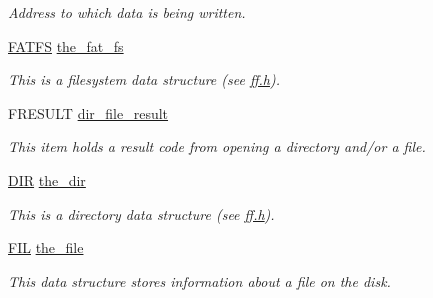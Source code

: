 \begin{DoxyCompactItemize}
\begin{DoxyCompactList}\small\item\em Address to which data is being written. \end{DoxyCompactList}\item 
\hypertarget{classsd__card_a908c8eb86a3ed04bd4653632e508588c}{\hyperlink{struct__FATFS__}{F\-A\-T\-F\-S} \hyperlink{classsd__card_a908c8eb86a3ed04bd4653632e508588c}{the\-\_\-fat\-\_\-fs}}\label{classsd__card_a908c8eb86a3ed04bd4653632e508588c}

\begin{DoxyCompactList}\small\item\em This is a filesystem data structure (see \hyperlink{ff_8h_source}{ff.\-h}). \end{DoxyCompactList}\item 
\hypertarget{classsd__card_a8958a4296da8a494dee943b09397e9bc}{F\-R\-E\-S\-U\-L\-T \hyperlink{classsd__card_a8958a4296da8a494dee943b09397e9bc}{dir\-\_\-file\-\_\-result}}\label{classsd__card_a8958a4296da8a494dee943b09397e9bc}

\begin{DoxyCompactList}\small\item\em This item holds a result code from opening a directory and/or a file. \end{DoxyCompactList}\item 
\hypertarget{classsd__card_a06bc90f0045658fd4605a0cec4457b8c}{\hyperlink{struct__DIR__}{D\-I\-R} \hyperlink{classsd__card_a06bc90f0045658fd4605a0cec4457b8c}{the\-\_\-dir}}\label{classsd__card_a06bc90f0045658fd4605a0cec4457b8c}

\begin{DoxyCompactList}\small\item\em This is a directory data structure (see \hyperlink{ff_8h_source}{ff.\-h}). \end{DoxyCompactList}\item 
\hypertarget{classsd__card_a4e9db40386a4f7cf82131a1eb47f9960}{\hyperlink{struct__FIL__}{F\-I\-L} \hyperlink{classsd__card_a4e9db40386a4f7cf82131a1eb47f9960}{the\-\_\-file}}\label{classsd__card_a4e9db40386a4f7cf82131a1eb47f9960}

\begin{DoxyCompactList}\small\item\em This data structure stores information about a file on the disk. \end{DoxyCompactList}\end{DoxyCompactItemize}


